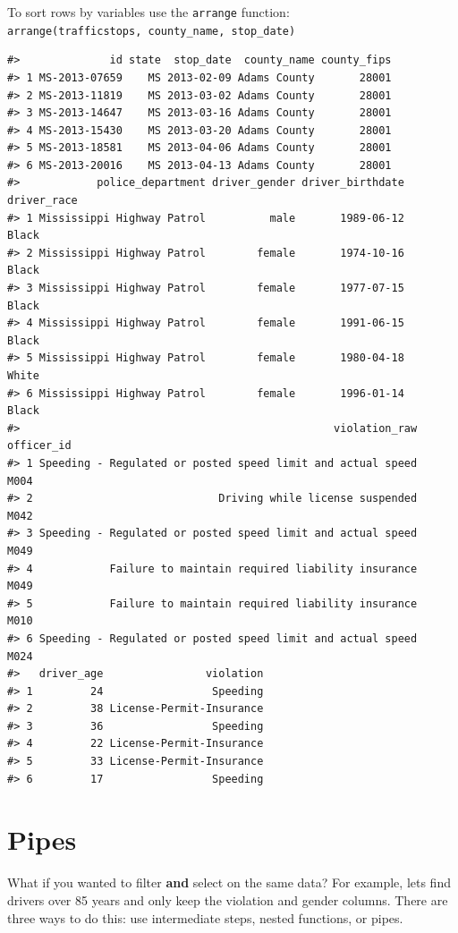 \documentclass[]{book}
\begin{document}
To sort rows by variables use the \texttt{arrange} function: \texttt{arrange(trafficstops,\ county\_name,\ stop\_date)}

\begin{verbatim}
#>              id state  stop_date  county_name county_fips
#> 1 MS-2013-07659    MS 2013-02-09 Adams County       28001
#> 2 MS-2013-11819    MS 2013-03-02 Adams County       28001
#> 3 MS-2013-14647    MS 2013-03-16 Adams County       28001
#> 4 MS-2013-15430    MS 2013-03-20 Adams County       28001
#> 5 MS-2013-18581    MS 2013-04-06 Adams County       28001
#> 6 MS-2013-20016    MS 2013-04-13 Adams County       28001
#>            police_department driver_gender driver_birthdate driver_race
#> 1 Mississippi Highway Patrol          male       1989-06-12       Black
#> 2 Mississippi Highway Patrol        female       1974-10-16       Black
#> 3 Mississippi Highway Patrol        female       1977-07-15       Black
#> 4 Mississippi Highway Patrol        female       1991-06-15       Black
#> 5 Mississippi Highway Patrol        female       1980-04-18       White
#> 6 Mississippi Highway Patrol        female       1996-01-14       Black
#>                                                 violation_raw officer_id
#> 1 Speeding - Regulated or posted speed limit and actual speed       M004
#> 2                             Driving while license suspended       M042
#> 3 Speeding - Regulated or posted speed limit and actual speed       M049
#> 4            Failure to maintain required liability insurance       M049
#> 5            Failure to maintain required liability insurance       M010
#> 6 Speeding - Regulated or posted speed limit and actual speed       M024
#>   driver_age                violation
#> 1         24                 Speeding
#> 2         38 License-Permit-Insurance
#> 3         36                 Speeding
#> 4         22 License-Permit-Insurance
#> 5         33 License-Permit-Insurance
#> 6         17                 Speeding
\end{verbatim}

\hypertarget{pipes}{%
\section{Pipes}\label{pipes}}

What if you wanted to filter \textbf{and} select on the same data? For example, lets find drivers over 85 years and only keep the violation and gender columns. There are three ways to do this: use intermediate steps, nested functions, or pipes.
\end{document}
